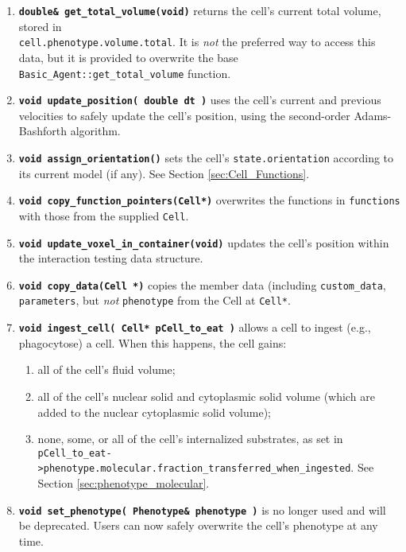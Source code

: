 \documentclass[12pt]{article}
\renewcommand{\v}{\verb}
\newcommand{\smallcode}[1]{\textbf{\texttt{#1}}}
\begin{document}
\begin{enumerate}
\item 
\smallcode{double\& get\_total\_volume(void)} returns the cell's 
current total volume, stored in \\
\v|cell.phenotype.volume.total|. It is 
\emph{not} the preferred way to access this data, but it is provided to 
overwrite the base \v|Basic_Agent::get_total_volume| function. 

\item 
\smallcode{void update\_position( double dt )} uses the cell's current 
and previous velocities to safely update the cell's position, using 
the second-order Adams-Bashforth algorithm. 

\item 
\smallcode{void assign\_orientation()} sets the cell's 
\v|state.orientation| according to its current model (if any). 
See Section \ref{sec:Cell_Functions}.  

\item 
\smallcode{void copy\_function\_pointers(Cell*)} overwrites 
the functions in \v|functions| with those from the 
supplied \v|Cell|. 

\item 
\smallcode{void update\_voxel\_in\_container(void)} updates the 
cell's position within the interaction testing data structure. 

\item 
\smallcode{void copy\_data(Cell *)} copies the member data 
(including \v|custom_data|, \v|parameters|, but \emph{not} \v|phenotype| 
from the Cell at \v|Cell*|. 

\item 
\smallcode{void ingest\_cell( Cell* pCell\_to\_eat )} allows a cell 
to ingest (e.g., phagocytose) a cell. When this happens, the cell gains: 
\begin{enumerate}
\item 
all of the cell's fluid volume; 
\item 
all of the cell's nuclear solid and cytoplasmic solid volume (which are added to 
the nuclear cytoplasmic solid volume); 
\item 
none, some, or all of the cell's internalized substrates, as set in \hfill\break 
\v|pCell_to_eat->phenotype.molecular.fraction_transferred_when_ingested|. See 
Section \ref{sec:phenotype_molecular}. 
\end{enumerate}


\item 
\smallcode{void set\_phenotype( Phenotype\& phenotype )} is no longer used 
and will be deprecated. Users can now safely overwrite the cell's phenotype 
at any time. 


\end{enumerate}
\end{document}
